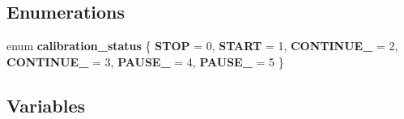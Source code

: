 \subsection*{Enumerations}
\begin{DoxyCompactItemize}
\item 
\mbox{\label{globals_8h_a97a989322df9dca90b38ef77610b8301}} 
enum {\bfseries calibration\+\_\+status} \{ \newline
{\bfseries S\+T\+OP} = 0, 
{\bfseries S\+T\+A\+RT} = 1, 
{\bfseries C\+O\+N\+T\+I\+N\+U\+E\+\_} = 2, 
{\bfseries C\+O\+N\+T\+I\+N\+U\+E\+\_} = 3, 
\newline
{\bfseries P\+A\+U\+S\+E\+\_} = 4, 
{\bfseries P\+A\+U\+S\+E\+\_} = 5
 \}
\end{DoxyCompactItemize}
\subsection*{Variables}
